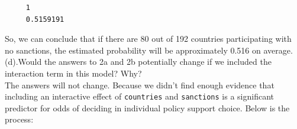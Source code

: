 \documentclass{article} %
\begin{document}
\begin{verbatim}
	 1 
	 0.5159191 
\end{verbatim}

So, we can conclude that if there are 80 out of 192 countries participating with no sanctions, the estimated probability will be approximately 0.516 on average. \\

\newpage 
\noindent (d).Would the answers to 2a and 2b potentially change if we included the interaction term in this model? Why? \\

\noindent The answers will not change. Because we didn't find enough evidence that including an interactive effect of \texttt{countries} and \texttt{sanctions} is a significant predictor for odds of deciding in individual policy support choice. Below is the process: \\

 
\end{document}

